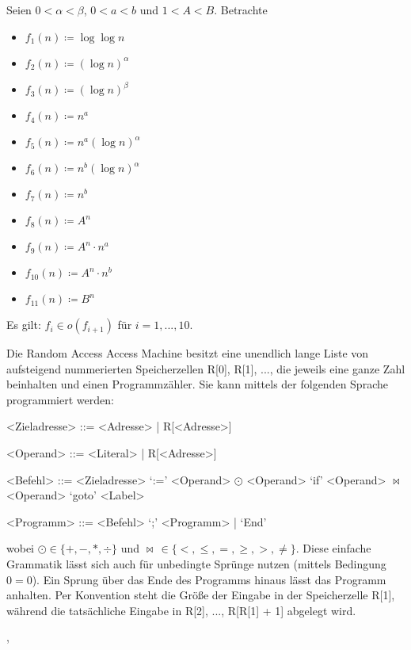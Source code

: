 \documentclass{cheat-sheet}
\begin{document}
\begin{satz}
  Seien $0 < \alpha < \beta$, $0 < a < b$ und $1 < A < B$. Betrachte
  \begin{multicols}{3}
    \begin{itemize}
      \item $f_1(n) \coloneqq \log \log n$
      \item $f_2(n) \coloneqq (\log n)^\alpha$
      \item $f_3(n) \coloneqq (\log n)^\beta$
      \item $f_4(n) \coloneqq n^a$
      \item $f_5(n) \coloneqq n^a (\log n)^\alpha$
      \item $f_6(n) \coloneqq n^b (\log n)^\alpha$
      \item $f_7(n) \coloneqq n^b$
      \item $f_8(n) \coloneqq A^n$
      \item $f_9(n) \coloneqq A^n \cdot n^a$
      \item $f_{10}(n) \coloneqq A^n \cdot n^b$
      \item $f_{11}(n) \coloneqq B^n$
    \end{itemize}
  \end{multicols}
  Es gilt: $f_i \in o(f_{i+1})$ für $i = 1, ..., 10$.
\end{satz}


\begin{definition}[RAM]
  Die Random Access Access Machine besitzt eine unendlich lange Liste von aufsteigend nummerierten Speicherzellen R[0], R[1], ..., die jeweils eine ganze Zahl beinhalten und einen Programmzähler. Sie kann mittels der folgenden Sprache programmiert werden:
  \begin{grammar}
    <Zieladresse> ::= <Adresse> | R[<Adresse>]

    <Operand> ::= <Literal> | R[<Adresse>]

    <Befehl> ::= <Zieladresse> `:=' <Operand> $\odot$ <Operand>
    \alt `if' <Operand> $\bowtie$ <Operand> `goto' <Label>

    <Programm> ::= <Befehl> `;' <Programm> | `End'
  \end{grammar}
  wobei $\odot \in \{ +, -, *, \div \}$ und $\bowtie \, \in \{ <, \leq, =, \geq, >, \not= \}$. Diese einfache Grammatik lässt sich auch für unbedingte Sprünge nutzen (mittels Bedingung $0 = 0$). Ein Sprung über das Ende des Programms hinaus lässt das Programm anhalten. Per Konvention steht die Größe der Eingabe in der Speicherzelle R[1], während die tatsächliche Eingabe in R[2], ..., R[R[1] + 1] abgelegt wird.
\end{definition},
\end{document}
